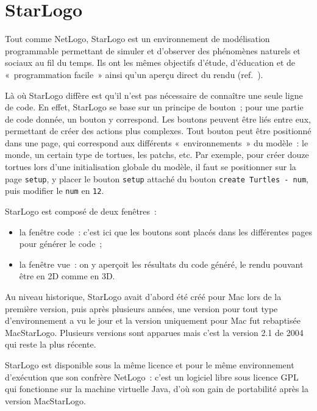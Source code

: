 \section{StarLogo}
\label{StarLogo}
Tout comme NetLogo, StarLogo est un environnement de modélisation programmable permettant de simuler et d'observer des phénomènes naturels et sociaux au fil du temps.
Ils ont les mêmes objectifs d'étude, d'éducation et de «~programmation facile~» ainsi qu'un aperçu direct du rendu (ref.~\cite{starlogo}).

Là où StarLogo diffère est qu'il n'est pas nécessaire de connaître une seule ligne de code. En effet, StarLogo se base sur un principe de bouton~; pour une partie de code donnée, un bouton y correspond. Les boutons peuvent être liés entre eux, permettant de créer des actions plus complexes.
Tout bouton peut être positionné dans une page, qui correspond aux différents «~environnements~» du modèle~: le monde, un certain type de tortues, les patchs, etc.
Par exemple, pour créer douze tortues lors d'une initialisation globale du modèle, il faut se positionner sur la page \verb|setup|, y placer le bouton \verb|setup| attaché du bouton \verb|create Turtles - num|, puis modifier le \verb|num| en \verb|12|.

StarLogo est composé de deux fenêtres~:
\begin{itemize}
  \item la fenêtre code~: c'est ici que les boutons sont placés dans les différentes pages pour générer le code~;
  \item la fenêtre vue~: on y aperçoit les résultats du code généré, le rendu pouvant être en 2D comme en 3D.
\end{itemize}

Au niveau historique, StarLogo avait d'abord été créé pour Mac lors de la première version, puis après plusieurs années, une version pour tout type d'environnement a vu le jour et la version uniquement pour Mac fut rebaptisée MacStarLogo. Plusieurs versions sont apparues mais c'est la version 2.1 de 2004 qui reste la plus récente.

StarLogo est disponible sous la même licence et pour le même environnement d'exécution que son confrère NetLogo~: c'est un logiciel libre sous licence GPL qui fonctionne sur la machine virtuelle Java, d'où son gain de portabilité après la version MacStarLogo.
